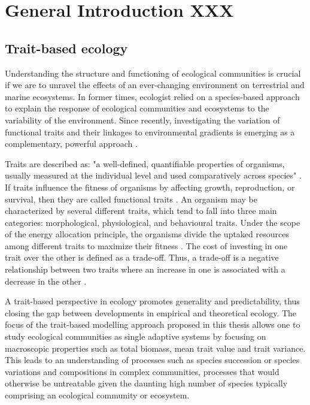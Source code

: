 \chapter{General Introduction XXX}

\section{Trait-based ecology}
Understanding the structure and functioning of ecological communities is crucial if we are to unravel the effects of an ever-changing environment on terrestrial and marine ecosystems. In former times, ecologist relied on a species-based approach to explain the response of ecological communities and ecosystems to the variability of the environment. Since recently, investigating the variation of functional traits and their linkages to environmental gradients is emerging as a complementary, powerful approach \citep{McGill2006,Violle2007}. 

Traits are described as: "a well-defined, quantifiable properties of organisms, usually measured at the individual level and used comparatively across species" \citep{McGill2006}. If traits influence the fitness of organisms by affecting growth, reproduction, or survival, then they are called functional traits \citep{Violle2007}.  An organism may be characterized by several different traits, which tend to fall into three main categories: morphological, physiological, and behavioural traits. Under the scope of the energy allocation principle, the organisms divide the uptaked resources among different traits to maximize their fitness \citep{Perrin1993}. The cost of investing in one trait over the other is defined as a trade-off. Thus, a trade-off is a negative relationship between two traits where an increase in one is associated with a decrease in the other \citep{Tilman2000}.

A trait-based perspective in ecology promotes generality and predictability, thus closing the gap between developments in empirical and theoretical ecology. The focus of the trait-based modelling approach proposed in this thesis allows one to study ecological communities as single adaptive systems by focusing on macroscopic properties such as total biomass, mean trait value and trait variance. This leads to an understanding of processes such as species succession \citep{Bruggeman2009} or species variations and compositions \citep{Ackerly2007,Messier2010} in complex communities, processes that would otherwise be untreatable given the daunting high number of species typically comprising an ecological community or ecosystem.

